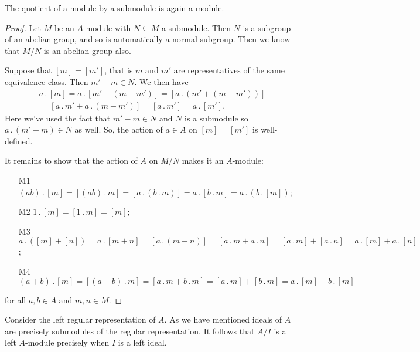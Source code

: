 \documentclass[fleqn]{NotesClass}
\newcommand{\action}{\mathbin{.}}
\begin{document}
    \begin{lma}{}{}
        The quotient of a module by a submodule is again a module.
        \begin{proof}
            Let \(M\) be an \(A\)-module with \(N \subseteq M\) a submodule.
            Then \(N\) is a subgroup of an abelian group, and so is automatically a normal subgroup.
            Then we know that \(M/N\) is an abelian group also.
            
            Suppose that \([m] = [m']\), that is \(m\) and \(m'\) are representatives of the same equivalence class.
            Then \(m' - m \in N\).
            We then have
            \begin{multline}
                a \action [m] = a \action [m' + (m - m')] = [a \action (m' + (m - m'))]\\
                = [a \action m' + a \action (m - m')] = [a \action m'] = a \action [m'].
            \end{multline}
            Here we've used the fact that \(m' - m \in N\) and \(N\) is a submodule so \(a \action (m' - m) \in N\) as well.
            So, the action of \(a \in A\) on \([m] = [m']\) is well-defined.
            
            It remains to show that the action of \(A\) on \(M/N\) makes it an \(A\)-module:
            \begin{itemize}
                \item[M1] \((ab) \action [m] = [(ab) \action m] = [a \action (b \action m)] = a \action [b \action m] = a \action (b \action [m])\);
                \item[M2] \(1 \action [m] = [1 \action m] = [m]\);
                \item[M3] \(a \action ([m] + [n]) = a \action [m + n] = [a \action (m + n)] = [a \action m + a \action n] = [a \action m] + [a \action n] = a \action [m] + a \action [n]\);
                \item[M4] \((a + b) \action [m] = [(a + b) \action m] = [a \action m + b \action m] = [a \action m] + [b \action m] = a \action [m] + b \action [m]\)
            \end{itemize}
            for all \(a, b \in A\) and \(m, n \in M\).
        \end{proof}
    \end{lma}
    
    \begin{remark}{}{}
        Consider the left regular representation of \(A\).
        As we have mentioned ideals of \(A\) are precisely submodules of the regular representation.
        It follows that \(A/I\) is a left \(A\)-module precisely when \(I\) is a left ideal.
    \end{remark}
    
\end{document}
